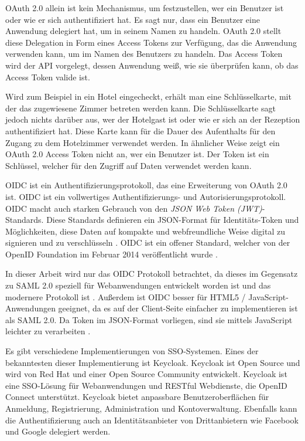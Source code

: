 OAuth 2.0 allein ist kein Mechanismus, um festzustellen, wer ein Benutzer ist oder wie er sich authentifiziert hat. Es sagt nur, dass ein Benutzer eine Anwendung delegiert hat, um in seinem Namen zu handeln. OAuth 2.0 stellt diese Delegation in Form eines Access Tokens zur Verfügung, das die Anwendung verwenden kann, um im Namen des Benutzers zu handeln. Das Access Token wird der API vorgelegt, dessen Anwendung weiß, wie sie überprüfen kann, ob das Access Token valide ist. \cite{SSEB_AuthorizationvsAuthentication}

Wird zum Beispiel in ein Hotel eingecheckt, erhält man eine Schlüsselkarte, mit der das zugewiesene Zimmer betreten werden kann. Die Schlüsselkarte sagt jedoch nichts darüber aus, wer der Hotelgast ist oder wie er sich an der Rezeption authentifiziert hat. Diese Karte kann für die Dauer des Aufenthalts für den Zugang zu dem Hotelzimmer verwendet werden. In ähnlicher Weise zeigt ein OAuth 2.0 Access Token nicht an, wer ein Benutzer ist. Der Token ist ein Schlüssel, welcher für den Zugriff auf Daten verwendet werden kann. \cite{SSEB_AuthorizationvsAuthentication}

OIDC ist ein Authentifizierungsprotokoll, das eine Erweiterung von OAuth 2.0 ist. OIDC ist ein vollwertiges Authentifizierungs- und Autorisierungsprotokoll. OIDC macht auch starken Gebrauch von den \textit{JSON Web Token (JWT)}-Standards. Diese Standards definieren ein JSON-Format für Identitäts-Token und Möglichkeiten, diese Daten auf kompakte und webfreundliche Weise digital zu signieren und zu verschlüsseln \cite{SSEB_RFC7519}. OIDC ist ein offener Standard, welcher von der OpenID Foundation im Februar 2014 veröffentlicht wurde \cite{EB4}.

In dieser Arbeit wird nur das OIDC Protokoll betrachtet, da dieses im Gegensatz zu SAML 2.0 speziell für Webanwendungen entwickelt worden ist und das modernere Protokoll ist \cite[OpenID Connect vs. SAML]{SSEB_keycloakDocs}. Außerdem ist OIDC besser für HTML5 / JavaScript-Anwendungen geeignet, da es auf der Client-Seite einfacher zu implementieren ist als SAML 2.0. Da Token im JSON-Format vorliegen, sind sie mittels JavaScript leichter zu verarbeiten \cite{SSEB_ssoProtocols}.

Es gibt verschiedene Implementierungen von SSO-Systemen. Eines der bekanntesten dieser Implementierung ist Keycloak. Keycloak ist Open Source und wird von Red Hat und einer Open Source Community entwickelt. Keycloak ist eine SSO-Lösung für Webanwendungen und RESTful Webdienste, die OpenID Connect unterstützt. Keycloak bietet anpassbare Benutzeroberflächen für Anmeldung, Registrierung, Administration und Kontoverwaltung. Ebenfalls kann die Authentifizierung auch an Identitätsanbieter von Drittanbietern wie Facebook und Google delegiert werden. \cite{SSEB_keycloakDocs}

